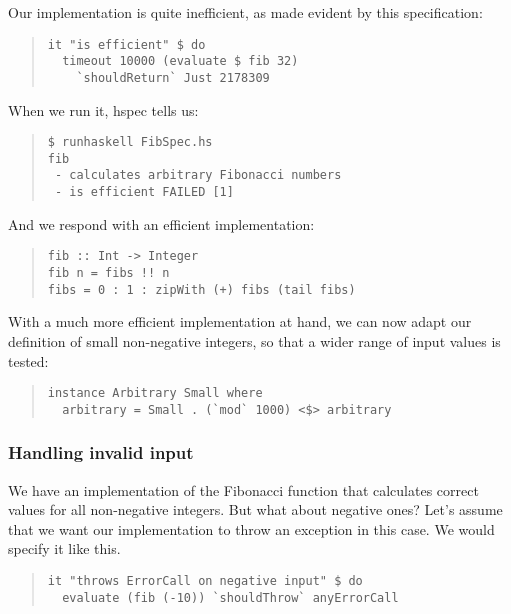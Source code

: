 \documentclass[preprint]{sigplanconf}
\begin{document}
Our implementation is quite inefficient, as made evident by this
specification:

\begin{quote}
\small
\begin{verbatim}
it "is efficient" $ do
  timeout 10000 (evaluate $ fib 32)
    `shouldReturn` Just 2178309
\end{verbatim}
\end{quote}

\noindent When we run it, hspec tells us:

\begin{quote}
\small
\begin{verbatim}
$ runhaskell FibSpec.hs
fib
 - calculates arbitrary Fibonacci numbers
 - is efficient FAILED [1]
\end{verbatim}
\end{quote}

\noindent And we respond with an efficient implementation:

\begin{quote}
\small
\begin{verbatim}
fib :: Int -> Integer
fib n = fibs !! n
fibs = 0 : 1 : zipWith (+) fibs (tail fibs)
\end{verbatim}
\end{quote}

\noindent With a much more efficient implementation at hand, we can
now adapt our definition of small non-negative integers, so that
a wider range of input values is tested:

\begin{quote}
\small
\begin{verbatim}
instance Arbitrary Small where
  arbitrary = Small . (`mod` 1000) <$> arbitrary
\end{verbatim}
\end{quote}


\subsubsection{Handling invalid input}

We have an implementation of the Fibonacci function
that calculates correct values for all non-negative integers.
But what about negative ones? Let's assume that we want our
implementation to throw an exception in this case. We would
specify it like this.

\begin{quote}
\small
\begin{verbatim}
it "throws ErrorCall on negative input" $ do
  evaluate (fib (-10)) `shouldThrow` anyErrorCall
\end{verbatim}
\end{quote}
\end{document}
